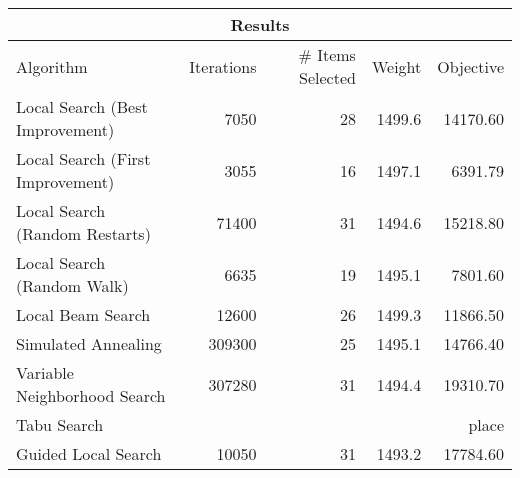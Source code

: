 \documentclass[12pt, letterpaper]{article}
\begin{document}
\begin{center}
\begin{tabular}{ l r r r r } 

 \multicolumn{5}{c}{Results} \\
 \hline
Algorithm & Iterations & \# Items Selected & Weight & Objective \\
 \hline 
Local Search (Best Improvement) & 7050 & 28 & 1499.6 & 14170.60 \\
Local Search (First Improvement) & 3055 & 16 & 1497.1 & 6391.79\\
Local Search (Random Restarts) & 71400 & 31 & 1494.6 & 15218.80\\
Local Search (Random Walk) & 6635 & 19 & 1495.1 & 7801.60\\
Local Beam Search & 12600 & 26 & 1499.3 & 11866.50\\
Simulated Annealing & 309300 & 25 & 1495.1 & 14766.40\\
Variable Neighborhood Search & 307280 & 31 & 1494.4 &  19310.70\\
Tabu Search &  &  &  & place\\
Guided Local Search &  10050 & 31 & 1493.2 & 17784.60\\
 \hline
\end{tabular}
\end{center}
\end{document}
